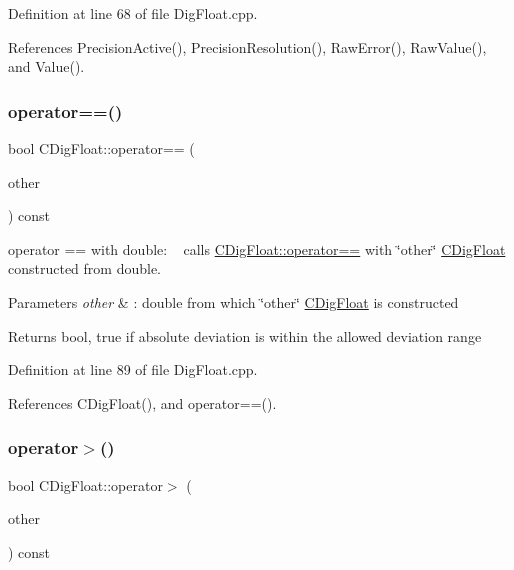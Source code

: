 Definition at line 68 of file Dig\+Float.\+cpp.



References Precision\+Active(), Precision\+Resolution(), Raw\+Error(), Raw\+Value(), and Value().

\mbox{\label{classCDigFloat_abb8746adc3bd94e002f7674eb6ab1165}} 
\subsubsection{\texorpdfstring{operator==()}{operator==()}\hspace{0.1cm}{\footnotesize\ttfamily [2/2]}}
{\footnotesize\ttfamily bool C\+Dig\+Float\+::operator== (\begin{DoxyParamCaption}\item[{const double}]{other }\end{DoxyParamCaption}) const}



operator == with double\+: ~\newline
 calls \hyperlink{classCDigFloat_ad8980d984bf2bab71d15b830fd0180a5}{C\+Dig\+Float\+::operator==} with \char`\"{}other\char`\"{} \hyperlink{classCDigFloat}{C\+Dig\+Float} constructed from double. 


\begin{DoxyParams}{Parameters}
{\em other} & \+: double from which \char`\"{}other\char`\"{} \hyperlink{classCDigFloat}{C\+Dig\+Float} is constructed \\
\hline
\end{DoxyParams}
\begin{DoxyReturn}{Returns}
bool, true if absolute deviation is within the allowed deviation range 
\end{DoxyReturn}


Definition at line 89 of file Dig\+Float.\+cpp.



References C\+Dig\+Float(), and operator==().

\mbox{\label{classCDigFloat_a06b58ba24f51ddcb737c826f2191d4c9}} 
\subsubsection{\texorpdfstring{operator$>$()}{operator>()}}
{\footnotesize\ttfamily bool C\+Dig\+Float\+::operator$>$ (\begin{DoxyParamCaption}\item[{const \hyperlink{classCDigFloat}{C\+Dig\+Float} \&}]{other }\end{DoxyParamCaption}) const}




